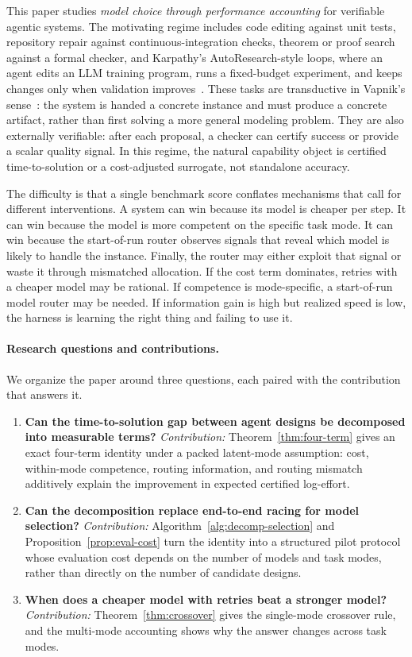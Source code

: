 \documentclass{article}
\begin{document}
This paper studies \emph{model choice through performance accounting} for verifiable agentic systems.
The motivating regime includes code editing against unit tests, repository repair against continuous-integration checks, theorem or proof search against a formal checker, and Karpathy's AutoResearch-style loops, where an agent edits an LLM training program, runs a fixed-budget experiment, and keeps changes only when validation improves~\citep{karpathy2026autoresearch}.
These tasks are transductive in Vapnik's sense~\citep{vapnik1996structure}: the system is handed a concrete instance and must produce a concrete artifact, rather than first solving a more general modeling problem.
They are also externally verifiable: after each proposal, a checker can certify success or provide a scalar quality signal.
In this regime, the natural capability object is certified time-to-solution or a cost-adjusted surrogate, not standalone accuracy.

The difficulty is that a single benchmark score conflates mechanisms that call for different interventions.
A system can win because its model is cheaper per step.
It can win because the model is more competent on the specific task mode.
It can win because the start-of-run router observes signals that reveal which model is likely to handle the instance.
Finally, the router may either exploit that signal or waste it through mismatched allocation.
If the cost term dominates, retries with a cheaper model may be rational.
If competence is mode-specific, a start-of-run model router may be needed.
If information gain is high but realized speed is low, the harness is learning the right thing and failing to use it.

\paragraph{Research questions and contributions.}
We organize the paper around three questions, each paired with the contribution that answers it.

\begin{enumerate}[leftmargin=1.4em,itemsep=0.15em]
  \item \textbf{Can the time-to-solution gap between agent designs be decomposed into measurable terms?}
  \emph{Contribution:} Theorem~\ref{thm:four-term} gives an exact four-term identity under a packed latent-mode assumption: cost, within-mode competence, routing information, and routing mismatch additively explain the improvement in expected certified log-effort.
  \item \textbf{Can the decomposition replace end-to-end racing for model selection?}
  \emph{Contribution:} Algorithm~\ref{alg:decomp-selection} and Proposition~\ref{prop:eval-cost} turn the identity into a structured pilot protocol whose evaluation cost depends on the number of models and task modes, rather than directly on the number of candidate designs.
  \item \textbf{When does a cheaper model with retries beat a stronger model?}
  \emph{Contribution:} Theorem~\ref{thm:crossover} gives the single-mode crossover rule, and the multi-mode accounting shows why the answer changes across task modes.
\end{enumerate}
\end{document}
